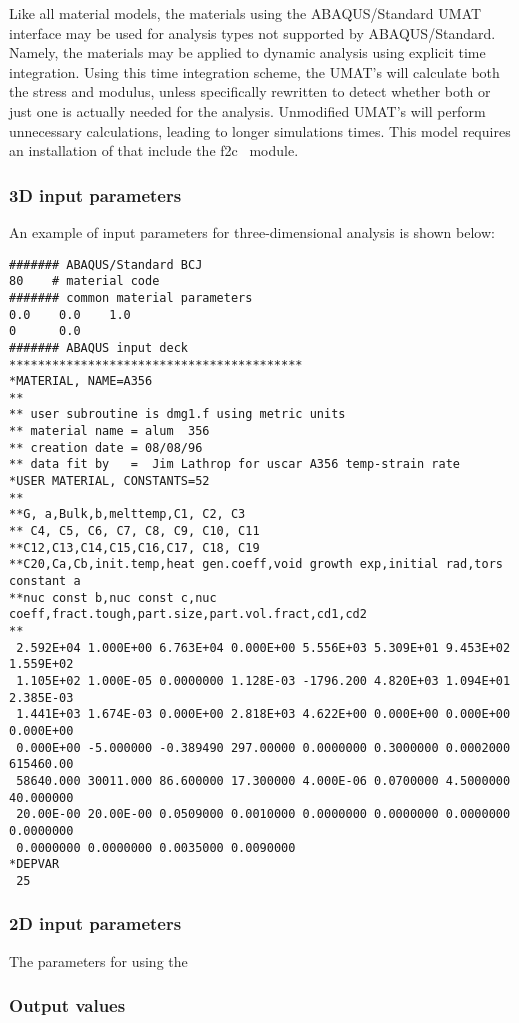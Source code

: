 Like all material models, the materials using the 
\textsf{ABAQUS/Standard UMAT} interface may be used for 
analysis types not supported by \textsf{ABAQUS/Standard}. Namely, the 
materials may be applied to dynamic analysis using explicit time 
integration. Using this time integration scheme, the \textsf{UMAT}'s
will calculate both the stress and modulus, unless specifically 
rewritten to detect whether both or just one is actually needed for 
the analysis. Unmodified \textsf{UMAT}'s will perform unnecessary 
calculations, leading to longer simulations times.
This model requires an installation of \tahoe that include the 
\textsf{f2c}~\cite{f2c} module. 

\subsubsection{3D input parameters}
An example of input parameters for three-dimensional analysis is shown 
below:
\begin{verbatim}
####### ABAQUS/Standard BCJ	
80    # material code
####### common material parameters
0.0    0.0    1.0
0      0.0
####### ABAQUS input deck
*****************************************
*MATERIAL, NAME=A356
**
** user subroutine is dmg1.f using metric units
** material name = alum  356                                               
** creation date = 08/08/96                                                    
** data fit by   =  Jim Lathrop for uscar A356 temp-strain rate
*USER MATERIAL, CONSTANTS=52
**
**G, a,Bulk,b,melttemp,C1, C2, C3
** C4, C5, C6, C7, C8, C9, C10, C11
**C12,C13,C14,C15,C16,C17, C18, C19
**C20,Ca,Cb,init.temp,heat gen.coeff,void growth exp,initial rad,tors constant a
**nuc const b,nuc const c,nuc coeff,fract.tough,part.size,part.vol.fract,cd1,cd2
**
 2.592E+04 1.000E+00 6.763E+04 0.000E+00 5.556E+03 5.309E+01 9.453E+02 1.559E+02
 1.105E+02 1.000E-05 0.0000000 1.128E-03 -1796.200 4.820E+03 1.094E+01 2.385E-03
 1.441E+03 1.674E-03 0.000E+00 2.818E+03 4.622E+00 0.000E+00 0.000E+00 0.000E+00
 0.000E+00 -5.000000 -0.389490 297.00000 0.0000000 0.3000000 0.0002000 615460.00
 58640.000 30011.000 86.600000 17.300000 4.000E-06 0.0700000 4.5000000 40.000000
 20.00E-00 20.00E-00 0.0509000 0.0010000 0.0000000 0.0000000 0.0000000 0.0000000
 0.0000000 0.0000000 0.0035000 0.0090000
*DEPVAR
 25
\end{verbatim}
	

\subsubsection{2D input parameters}
The parameters for using the 

\subsubsection{Output values}

